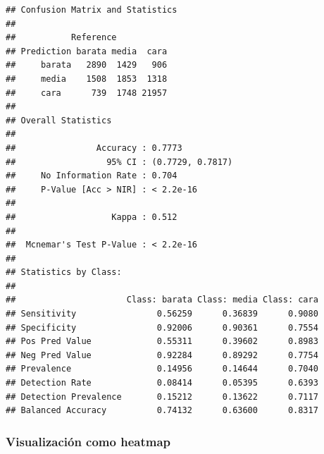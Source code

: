 \documentclass[
]{article}
\begin{document}
\begin{verbatim}
## Confusion Matrix and Statistics
## 
##           Reference
## Prediction barata media  cara
##     barata   2890  1429   906
##     media    1508  1853  1318
##     cara      739  1748 21957
## 
## Overall Statistics
##                                           
##                Accuracy : 0.7773          
##                  95% CI : (0.7729, 0.7817)
##     No Information Rate : 0.704           
##     P-Value [Acc > NIR] : < 2.2e-16       
##                                           
##                   Kappa : 0.512           
##                                           
##  Mcnemar's Test P-Value : < 2.2e-16       
## 
## Statistics by Class:
## 
##                      Class: barata Class: media Class: cara
## Sensitivity                0.56259      0.36839      0.9080
## Specificity                0.92006      0.90361      0.7554
## Pos Pred Value             0.55311      0.39602      0.8983
## Neg Pred Value             0.92284      0.89292      0.7754
## Prevalence                 0.14956      0.14644      0.7040
## Detection Rate             0.08414      0.05395      0.6393
## Detection Prevalence       0.15212      0.13622      0.7117
## Balanced Accuracy          0.74132      0.63600      0.8317
\end{verbatim}

\hypertarget{visualizaciuxf3n-como-heatmap}{%
\subsubsection{Visualización como
heatmap}\label{visualizaciuxf3n-como-heatmap}}
\end{document}
